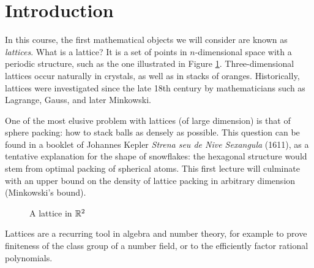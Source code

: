 



\newcommand{\butzero}{\setminus\{\vec 0\}}
\newcommand{\para}{\mathcal P}

\DeclareMathOperator{\Span}{Span}
\DeclareMathOperator{\GL}{GL}




\section{Introduction}

In this course, the first mathematical objects we will consider are known as {\em lattices}.  What is a lattice? It is a set of points in $n$-dimensional space with
a periodic structure, such as the one illustrated in Figure \ref{lec1:fig_a_lattice}.  Three-dimensional lattices occur naturally in crystals, as well as in stacks of oranges. Historically, lattices were investigated since the late 18th century by mathematicians such as Lagrange, Gauss, and later Minkowski. 

One of the most elusive problem with lattices (of large dimension) is that of sphere packing: how to stack balls as densely as possible. This question can be found in a booklet of Johannes Kepler {\em Strena seu de Nive Sexangula} (1611), as a tentative explanation for the shape of snowflakes: the hexagonal structure would stem from optimal packing of spherical atoms. This first lecture will culminate with an upper bound on the density of lattice packing in arbitrary dimension (Minkowski's bound).

\begin{figure}[h]
\caption{A lattice in $\mathbb{R}^{2}$}
\label{lec1:fig_a_lattice}
\end{figure}

Lattices are a recurring tool in algebra and number theory, for example to prove finiteness of the class group of a number field, or to the efficiently factor rational polynomials. 

